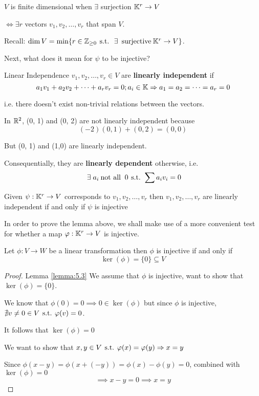 \begin{remark}
    \(V\) is finite dimensional when \(\exists\) surjection \(\mathbb{K}^r \to V\)

    \(\Leftrightarrow \exists r\) vectors \(v_1, v_2, \dots, v_r\) that span \(V\).

    Recall: \(\dim V = \min\{r \in \bbz_{\geq 0} \st \exists \:\text{surjective}\: \bbk^r \to V\}\).

    Next, what does it mean for \(\psi\) to be injective?
\end{remark}

\begin{definition} {Linear Independence}
    \(v_1, v_2, \dots, v_r \in V\) are \textbf{linearly independent} if \[
        a_1v_1 + a_2v_2 + \cdots + a_rv_r = 0; a_i \in \mathbb{K} \Rightarrow a_1 = a_2 = \cdots = a_r = 0
    \]

    i.e. there doesn't exist non-trivial relations between the vectors.
\end{definition}

\begin{example}
    In \(\mathbb{R}^2\), (0, 1) and (0, 2) are not linearly independent because \[
        (-2) (0, 1) + (0, 2) = (0, 0)
    \]

    But (0, 1) and (1,0) are linearly independent.
\end{example}

Consequentially, they are \textbf{linearly dependent} otherwise, i.e. \[
    \exists a_i \:\text{not all }\: 0 \st \sum a_iv_i = 0
\]
\begin{lemma} \label{lemma:5.2}
    Given \(\psi: \mathbb{K}^r \to V\) corresponds to \(v_1, v_2, \dots, v_r\) then \(v_1, v_2, \dots, v_r\) are linearly independent if and only if \(\psi\) is injective
\end{lemma}


In order to prove the lemma above, we shall make use of a more convenient test for whether a map \(\varphi: \mathbb{K}^r \to V\) is injective.

\begin{lemma} \label{lemma:5.3}
    Let \(\phi: V \to W\) be a linear transformation then \(\phi\) is injective if and only if \[
        \ker(\phi) = \{0\} \subseteq V
    \]
\end{lemma}

\begin{proof} {Lemma \ref{lemma:5.3}}
    \pffwd We assume that \(\phi\) is injective, want to show that \(\ker(\phi) = \{0\}\).

    We know that \(\phi(0) = 0 \implies 0 \in \ker(\phi) \) but since \(\phi\) is injective, \(\nexists v \neq 0 \in V \hspace*{4pt}\text{s.t.}\hspace*{4pt} \varphi(v) = 0\).

    It follows that \(\ker(\phi) = {0}\)

    \pfbwd We want to show that \(x, y \in V \hspace*{4pt}\text{s.t.}\hspace*{4pt} \varphi(x) = \varphi(y) \Rightarrow x = y\)

    Since \(\phi(x-y)  = \phi(x + (-y)) = \phi(x) - \phi(y) = 0\), combined with \(\ker(\phi) = {0}\) \[
        \implies x - y = 0 \implies x =y
    \]
\end{proof}

